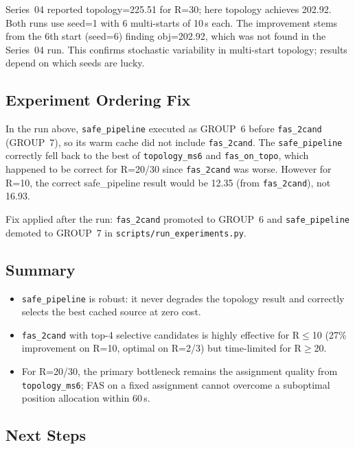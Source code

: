 Series~04 reported topology=225.51 for R=30; here topology achieves 202.92.
Both runs use seed=1 with 6 multi-starts of 10\,s each.  The improvement
stems from the 6th start (seed=6) finding obj=202.92, which was not found in
the Series~04 run.  This confirms stochastic variability in multi-start
topology; results depend on which seeds are lucky.

\subsection{Experiment Ordering Fix}
\label{exp:exp05-ordering}

In the run above, \texttt{safe\_pipeline} executed as GROUP~6 before
\texttt{fas\_2cand} (GROUP~7), so its warm cache did not include
\texttt{fas\_2cand}.  The \texttt{safe\_pipeline} correctly fell back to
the best of \texttt{topology\_ms6} and \texttt{fas\_on\_topo}, which happened
to be correct for R=20/30 since \texttt{fas\_2cand} was worse.  However for
R=10, the correct safe\_pipeline result would be 12.35 (from \texttt{fas\_2cand}),
not 16.93.

Fix applied after the run: \texttt{fas\_2cand} promoted to GROUP~6 and
\texttt{safe\_pipeline} demoted to GROUP~7 in \texttt{scripts/run\_experiments.py}.

\subsection{Summary}

\begin{itemize}[noitemsep]
    \item \texttt{safe\_pipeline} is robust: it never degrades the topology
          result and correctly selects the best cached source at zero cost.
    \item \texttt{fas\_2cand} with top-4 selective candidates is highly
          effective for R$\leq$10 (27\% improvement on R=10, optimal on
          R=2/3) but time-limited for R$\geq$20.
    \item For R=20/30, the primary bottleneck remains the assignment quality
          from \texttt{topology\_ms6}; FAS on a fixed assignment cannot
          overcome a suboptimal position allocation within 60\,s.
\end{itemize}

\subsection{Next Steps}
\label{exp:exp05-next}

